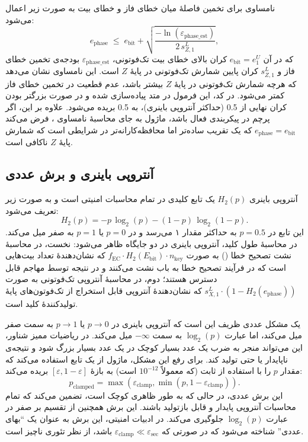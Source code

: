نامساوی  برای تخمین فاصلۀ میان خطای فاز و خطای بیت به صورت زیر اعمال می‌شود:
\begin{equation}
	e_{\text{phase}} \;\le\; e_{\text{bit}} + \sqrt{\frac{-\ln(\varepsilon_{\text{phase\_est}})}{2\,s_{Z,1}^L}},
\end{equation}
که در آن $e_{\text{bit}} = e_1^U$ کران بالای خطای بیت تک‌فوتونی، $\varepsilon_{\text{phase\_est}}$ بودجه‌ی تخمین خطای فاز و $s_{Z,1}^L$ کران پایین شمارش تک‌فوتونی در پایۀ $Z$ است. این نامساوی نشان می‌دهد که هرچه شمارش تک‌فوتونی در پایۀ $Z$ بیشتر باشد، عدم قطعیت در تخمین خطای فاز کمتر می‌شود. در کد، این فرمول در متد  پیاده‌سازی شده و در صورت بزرگتر بودن کران نهایی از 0.5 (حداکثر آنتروپی باینری)، به 0.5 بریده می‌شود. علاوه بر این، اگر پرچم  در پیکربندی فعال باشد، ماژول به جای محاسبۀ نامساوی ، فرض می‌کند $e_{\text{phase}} = e_{\text{bit}}$ که یک تقریب ساده‌تر اما محافظه‌کارانه‌تر در شرایطی است که شمارش پایۀ $Z$ ناکافی است.

\subsection{آنتروپی باینری و برش عددی}

آنتروپی باینری $H_2(p)$ یک تابع کلیدی در تمام محاسبات امنیتی  است و به صورت زیر تعریف می‌شود:
\begin{equation}
	H_2(p) = -p\,\log_2(p) - (1 - p)\,\log_2(1 - p).
\end{equation}
این تابع در $p = 0.5$ به حداکثر مقدار ۱ می‌رسد و در $p = 0$ یا $p = 1$ به صفر میل می‌کند. در محاسبۀ طول کلید، آنتروپی باینری در دو جایگاه ظاهر می‌شود: نخست، در محاسبۀ نشت تصحیح خطا () به صورت $f_{\text{EC}} \cdot H_2(E_{\text{bit}}) \cdot n_{\text{key}}$ که نشان‌دهندۀ تعداد بیت‌هایی است که در فرآیند تصحیح خطا به باب نشت می‌کنند و در نتیجه توسط مهاجم قابل دسترس هستند؛ دوم، در محاسبۀ آنتروپی تک‌فوتونی به صورت $s_{X,1}^L \cdot (1 - H_2(e_{\text{phase}}))$ که نشان‌دهندۀ آنتروپی قابل استخراج از تک‌فوتون‌های پایۀ تولیدکنندۀ کلید است.

یک مشکل عددی ظریف این است که آنتروپی باینری در $p \to 0$ یا $p \to 1$ به سمت صفر میل می‌کند، اما عبارت $\log_2(p)$ به سمت $-\infty$ میل می‌کند. در ریاضیات ممیز شناور، این می‌تواند منجر به ضرب یک عدد بسیار کوچک در یک عدد بسیار بزرگ شود و نتیجه‌ی ناپایدار یا حتی  تولید کند. برای رفع این مشکل، ماژول از یک تابع  استفاده می‌کند که مقدار $p$ را با استفاده از ثابت  (که معمولاً $10^{-12}$ است) به بازۀ $[\varepsilon, 1 - \varepsilon]$ بریده می‌کند:
\begin{equation}
	p_{\text{clamped}} = \max(\varepsilon_{\text{clamp}}, \min(p, 1 - \varepsilon_{\text{clamp}})).
\end{equation}
این برش عددی، در حالی که به طور ظاهری کوچک است، تضمین می‌کند که تمام محاسبات آنتروپی پایدار و قابل بازتولید باشند. این برش همچنین از تقسیم بر صفر در عبارت $\log_2(p)$ جلوگیری می‌کند. در ادبیات امنیتی، این برش به عنوان یک ``بهای عددی'' شناخته می‌شود که در صورتی که $\varepsilon_{\text{clamp}} \ll \varepsilon_{\text{sec}}$ باشد، از نظر تئوری ناچیز است.

